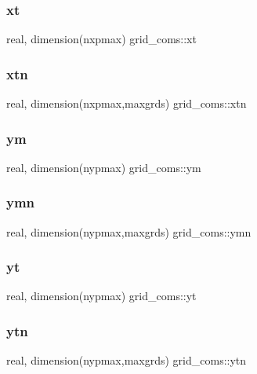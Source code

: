 \subsubsection{\texorpdfstring{xt}{xt}}
{\footnotesize\ttfamily real, dimension(nxpmax) grid\+\_\+coms\+::xt}

\mbox{\label{namespacegrid__coms_ac434d86587ed3416352d2ee40a8a542f}} 
\subsubsection{\texorpdfstring{xtn}{xtn}}
{\footnotesize\ttfamily real, dimension(nxpmax,maxgrds) grid\+\_\+coms\+::xtn}

\mbox{\label{namespacegrid__coms_a4e0c01da9f5b650af168d526fc6161e6}} 
\subsubsection{\texorpdfstring{ym}{ym}}
{\footnotesize\ttfamily real, dimension(nypmax) grid\+\_\+coms\+::ym}

\mbox{\label{namespacegrid__coms_ac86adbc4cb710451d5b9ae53178a756b}} 
\subsubsection{\texorpdfstring{ymn}{ymn}}
{\footnotesize\ttfamily real, dimension(nypmax,maxgrds) grid\+\_\+coms\+::ymn}

\mbox{\label{namespacegrid__coms_a24ff2ae7949aa76dc0d798ef5baa5aab}} 
\subsubsection{\texorpdfstring{yt}{yt}}
{\footnotesize\ttfamily real, dimension(nypmax) grid\+\_\+coms\+::yt}

\mbox{\label{namespacegrid__coms_aa853f8064bf96a5159ba89902bf37efb}} 
\subsubsection{\texorpdfstring{ytn}{ytn}}
{\footnotesize\ttfamily real, dimension(nypmax,maxgrds) grid\+\_\+coms\+::ytn}

